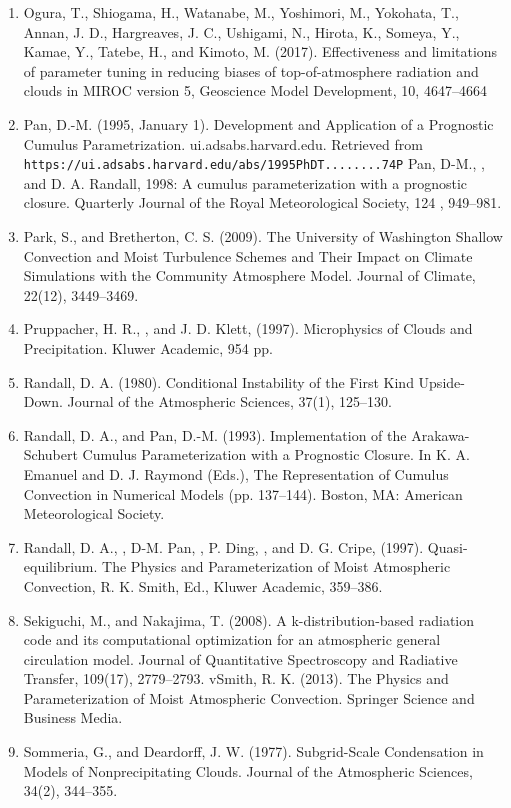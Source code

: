 \begin{enumerate}
\item Ogura, T., Shiogama, H., Watanabe, M., Yoshimori, M., Yokohata, T., Annan, J. D., Hargreaves, J. C., Ushigami, N., Hirota, K., Someya, Y., Kamae, Y., Tatebe, H., and Kimoto, M. (2017). Effectiveness and limitations of parameter tuning in reducing biases of top-of-atmosphere radiation and clouds in MIROC version 5, Geoscience Model Development, 10, 4647–4664
\item Pan, D.-M. (1995, January 1). Development and Application of a Prognostic Cumulus Parametrization. ui.adsabs.harvard.edu. Retrieved from \\
\texttt{https://ui.adsabs.harvard.edu/abs/1995PhDT........74P}
\imte Pan, D-M., , and D. A. Randall, 1998: A cumulus parameterization with a prognostic closure. Quarterly Journal of the Royal Meteorological Society, 124 , 949–981.
\item Park, S., and Bretherton, C. S. (2009). The University of Washington Shallow Convection and Moist Turbulence Schemes and Their Impact on Climate Simulations with the Community Atmosphere Model. Journal of Climate, 22(12), 3449–3469.
\item Pruppacher, H. R., , and J. D. Klett, (1997). Microphysics of Clouds and Precipitation. Kluwer Academic, 954 pp.
\item Randall, D. A. (1980). Conditional Instability of the First Kind Upside-Down. Journal of the Atmospheric Sciences, 37(1), 125–130.
\item Randall, D. A., and Pan, D.-M. (1993). Implementation of the Arakawa-Schubert Cumulus Parameterization with a Prognostic Closure. In K. A. Emanuel and D. J. Raymond (Eds.), The Representation of Cumulus Convection in Numerical Models (pp. 137–144). Boston, MA: American Meteorological Society.
\item Randall, D. A., , D-M. Pan, , P. Ding, , and D. G. Cripe, (1997). Quasi-equilibrium. The Physics and Parameterization of Moist Atmospheric Convection, R. K. Smith, Ed., Kluwer Academic, 359–386.
\item Sekiguchi, M., and Nakajima, T. (2008). A k-distribution-based radiation code and its computational optimization for an atmospheric general circulation model. Journal of Quantitative Spectroscopy and Radiative Transfer, 109(17), 2779–2793.
vSmith, R. K. (2013). The Physics and Parameterization of Moist Atmospheric Convection. Springer Science and Business Media.
\item Sommeria, G., and Deardorff, J. W. (1977). Subgrid-Scale Condensation in Models of Nonprecipitating Clouds. Journal of the Atmospheric Sciences, 34(2), 344–355.

\end{enumerate}
